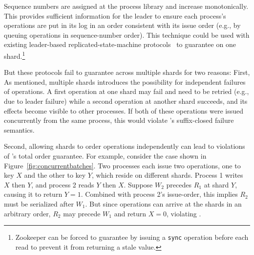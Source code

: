 
 Sequence numbers are assigned at the process 
library and increase monotonically. This provides sufficient information for
the leader to ensure each process's operations are put in its log in an
order consistent with its issue order
(e.g., by queuing operations in sequence-number order).
This technique could be used with existing leader-based replicated-state-machine
protocols~\cite{ongaro2014raft,lamport1998paxos,oki1988vr} to guarantee
\MDL{} on one shard.\footnote{Zookeeper can be forced to
guarantee \MDL{} by issuing a \texttt{sync} operation before each read to prevent it from returning a stale value.}

But these protocols fail to 
guarantee \MDL{} across multiple shards for two reasons: First,
As mentioned, multiple shards
introduces the possibility for independent failures of operations. A first
operation at one shard may fail and need to be retried (e.g., due to
leader failure) while a second operation at another shard succeeds, and
its effects become visible to other processes. If both of these
operations were issued concurrently from the same process, 
this would violate \MDL{}'s suffix-closed failure semantics.

Second, allowing shards to order operations independently can lead to
violations of \MDL{}'s total order guarantee. For example, consider the
case shown in Figure~\ref{fig:concurrentbatches}. Two processes each issue two
operations, one to key $X$ and the other to key $Y$, which reside on different
shards. Process 1 writes $X$ then $Y$, and process 2 reads $Y$ then $X$. Suppose $W_2$ precedes $R_1$ at shard $Y$, causing it to return $Y=1$. Combined with
process 2's issue-order, this implies $R_2$ must be serialized after $W_1$.
But since operations can arrive at the shards in an arbitrary order, $R_2$ may
precede $W_1$ and return $X=0$, violating \MDL{}.

%
